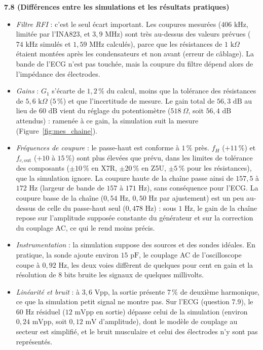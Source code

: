 \documentclass[11pt,letterpaper]{article}
\newcommand{\question}[1]{\needspace{12\baselineskip}\par\medskip\noindent\textbf{#1}\par\smallskip}
\begin{document}
\question{7.8 (Différences entre les simulations et les résultats pratiques)}
\begin{itemize}
\item \textit{Filtre RFI} : c'est le seul écart important. Les coupures mesurées ($406\text{ kHz}$, limitée par l'INA823, et $3,9\text{ MHz}$) sont très au-dessus des valeurs prévues ($74\text{ kHz}$ simulés et $1,59\text{ MHz}$ calculés), parce que les résistances de $1\text{ k}\Omega$ étaient montées après les condensateurs et non avant (erreur de câblage). La bande de l'ECG n'est pas touchée, mais la coupure du filtre dépend alors de l'impédance des électrodes.
\item \textit{Gains} : $G_1$ s'écarte de $1,2\,\%$ du calcul, moins que la tolérance des résistances de $5,6\text{ k}\Omega$ ($5\,\%$) et que l'incertitude de mesure. Le gain total de $56,3\text{ dB}$ au lieu de $60\text{ dB}$ vient du réglage du potentiomètre ($518\ \Omega$, soit $56,4\text{ dB}$ attendus) : ramenée à ce gain, la simulation suit la mesure (Figure~\ref{fig:mes_chaine}).
\item \textit{Fréquences de coupure} : le passe-haut est conforme à $1\,\%$ près. $f_H$ ($+11\,\%$) et $f_{c,\text{out}}$ ($+10$ à $15\,\%$) sont plus élevées que prévu, dans les limites de tolérance des composants ($\pm 10\,\%$ en X7R, $\pm 20\,\%$ en Z5U, $\pm 5\,\%$ pour les résistances), que la simulation ignore. La coupure haute de la chaîne passe ainsi de $157,5$ à $172\text{ Hz}$ (largeur de bande de $157$ à $171\text{ Hz}$), sans conséquence pour l'ECG. La coupure basse de la chaîne ($0,54\text{ Hz}$, $0,50\text{ Hz}$ par ajustement) est un peu au-dessus de celle du passe-haut seul ($0,478\text{ Hz}$) : sous $1\text{ Hz}$, le gain de la chaîne repose sur l'amplitude supposée constante du générateur et sur la correction du couplage AC, ce qui le rend moins précis.
\item \textit{Instrumentation} : la simulation suppose des sources et des sondes idéales. En pratique, la sonde ajoute environ $15\text{ pF}$, le couplage AC de l'oscilloscope coupe à $0,92\text{ Hz}$, les deux voies diffèrent de quelques pour cent en gain et la résolution de 8 bits bruite les signaux de quelques millivolts.
\item \textit{Linéarité et bruit} : à $3,6\text{ Vpp}$, la sortie présente $7\,\%$ de deuxième harmonique, ce que la simulation petit signal ne montre pas. Sur l'ECG (question 7.9), le $60\text{ Hz}$ résiduel ($12\text{ mVpp}$ en sortie) dépasse celui de la simulation (environ $0,24\text{ mVpp}$, soit $0,12\text{ mV}$ d'amplitude), dont le modèle de couplage au secteur est simplifié, et le bruit musculaire et celui des électrodes n'y sont pas représentés.
\end{itemize}
\end{document}
